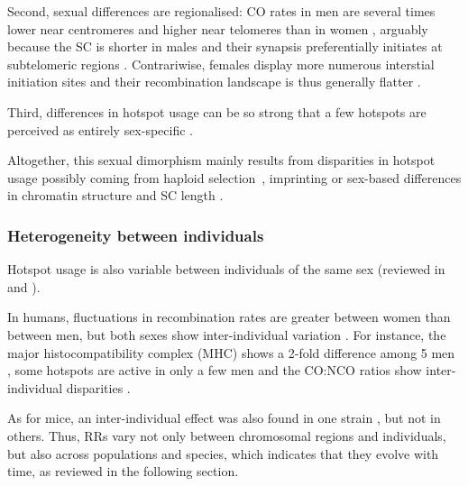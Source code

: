 Second, sexual differences are regionalised: CO rates in men are several times lower near centromeres and higher near telomeres than in women \citep[reviewed in][]{buard2007playing}, arguably because the SC is shorter in males \citep{tease2004intersex} and their synapsis preferentially initiates at subtelomeric regions \citep{brown2005meiotic}.
Contrariwise, females display more numerous interstial initiation sites and their recombination landscape is thus generally flatter \citep{paigen2008recombinational}.

Third, differences in hotspot usage can be so strong that a few hotspots are perceived as entirely sex-specific \citep{shiroishi1990recombinational,shiroishi1991genetic}.

Altogether, this sexual dimorphism mainly results from disparities in hotspot usage \citep{brick2018extensive} possibly coming from haploid selection \citep{lenormand2005recombination}, imprinting \citep{lercher2003imprinted} or sex-based differences in chromatin structure \citep{gerton2005homologous} and SC length \citep{petkov2007crossover}.






\subsubsection{Heterogeneity between individuals}

Hotspot usage is also variable between individuals of the same sex (reviewed in \citealp{popa2011evolution} and \citealp{capilla2016mammalian}).

In humans, fluctuations in recombination rates are greater between women than between men, but both sexes show inter-individual variation \citep{cheung2007polymorphic}.
For instance, the major histocompatibility complex (MHC) shows a 2-fold difference among 5 men \citep{yu1996individual}, some hotspots are active in only a few men \citep{neumann2006polymorphism} and the CO:NCO ratios show inter-individual disparities \citep{jeffreys2005factors,sarbajna2012major}.

As for mice, an inter-individual effect was also found in one strain \citep{koehler2002genetic}, but not in others.
Thus, RRs vary not only between chromosomal regions and individuals, but also across populations and species, which indicates that they evolve with time, as reviewed in the following section.





